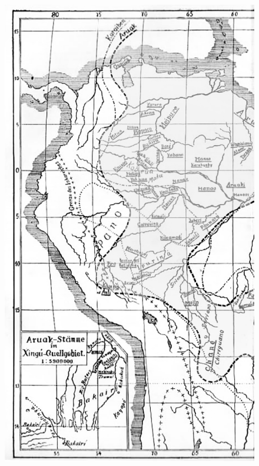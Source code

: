 \begin{figure}[H]
\begin{absolutelynopagebreak}
  \hspace{2cm}
  \includegraphics[width=\textwidth]{./MAPA_PINTADO_PT1.pdf}  

\end{absolutelynopagebreak}
\end{figure}


